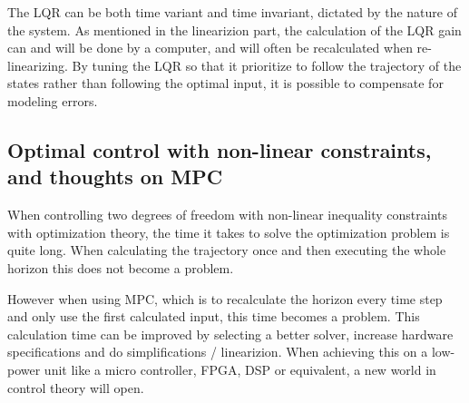 The LQR can be both time variant and time invariant, dictated by the nature of the system. As mentioned in the linearizion part, the calculation of the LQR gain can and will be done by a computer, and will often be recalculated when re-linearizing. By tuning the LQR so that it prioritize to follow the trajectory of the states rather than following the optimal input, it is possible to compensate for modeling errors.

\subsection{Optimal control with non-linear constraints, and thoughts on MPC}
When controlling two degrees of freedom with non-linear inequality constraints with optimization theory, the time it takes to solve the optimization problem is quite long. When calculating the trajectory once and then executing the whole horizon this does not become a problem.

However when using MPC, which is to recalculate the horizon every time step and only use the first calculated input, this time becomes a problem. This calculation time can be improved by selecting a better solver, increase hardware specifications and do simplifications / linearizion. When achieving this on a low-power unit like a micro controller, FPGA, DSP or equivalent, a new world in control theory will open.
